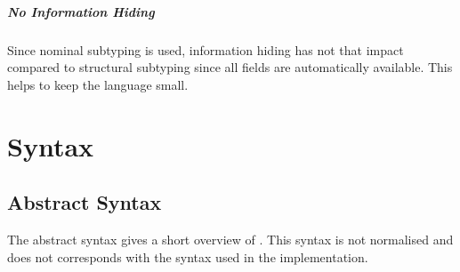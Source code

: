 \paragraph{No Information Hiding}
Since nominal subtyping is used, information hiding has not that impact
compared to structural subtyping since all fields are automatically
available. This helps to keep the language small.

\chapter{Syntax}

\section{Abstract Syntax}
The abstract syntax gives a short overview of \ooplss. This syntax is
not normalised and does not corresponds with the syntax used in the
implementation.\\

